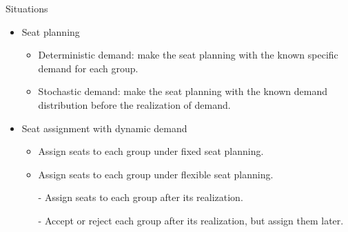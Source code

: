     \begin{frame}{Situations}
      \begin{itemize}
        \item Seat planning
        \vspace*{0.2cm}
        \begin{itemize}
          \item Deterministic demand: make the seat planning with the known specific demand for each group.
          \item Stochastic demand: make the seat planning with the known demand distribution before the realization of demand.
        \end{itemize}
        
        \item Seat assignment with dynamic demand
        
        \begin{itemize}
          \vspace*{0.2cm}
          \item Assign seats to each group under fixed seat planning.
          \vspace*{0.2cm}
          \item Assign seats to each group under flexible seat planning.
          \vspace*{0.2cm}
            \item[-] Assign seats to each group after its realization.
            \item[-] Accept or reject each group after its realization, but assign them later.
        \end{itemize}
      \end{itemize}
    \end{frame}
